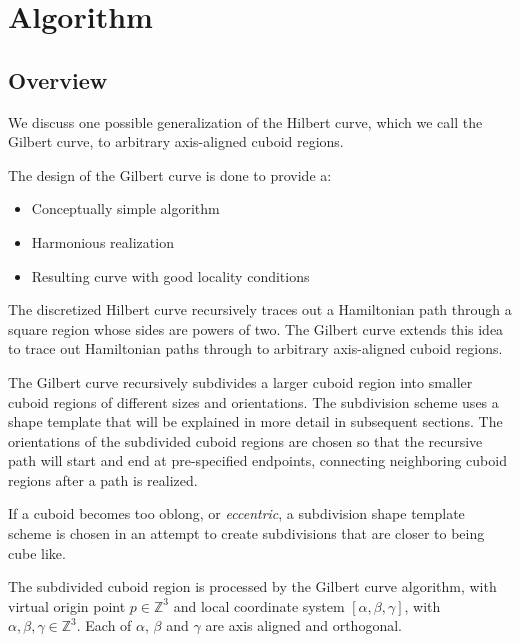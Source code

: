 \section{Algorithm}

\subsection{Overview}

We discuss one possible generalization of the Hilbert curve, which we call the Gilbert curve,
to arbitrary axis-aligned cuboid regions.

The design of the Gilbert curve is done to provide a:

\begin{itemize}
  \item Conceptually simple algorithm
  \item Harmonious realization
  \item Resulting curve with good locality conditions
\end{itemize}

The discretized Hilbert curve recursively traces out a Hamiltonian path through a square
region whose sides are powers of two.
The Gilbert curve extends this idea to trace out Hamiltonian paths through to arbitrary axis-aligned
cuboid regions.

The Gilbert curve recursively subdivides a larger cuboid region into smaller cuboid
regions of different sizes and orientations.
The subdivision scheme uses a shape template that will be explained in more detail in subsequent sections.
The orientations of the subdivided cuboid regions are chosen so that the recursive path
will start and end at pre-specified endpoints, connecting neighboring cuboid regions
after a path is realized.

If a cuboid becomes too oblong, or \textit{eccentric}, a subdivision shape template scheme is chosen
in an attempt to create subdivisions that are closer to being cube like.


The subdivided cuboid region is processed by the Gilbert curve algorithm,
with virtual origin point $p \in \mathbb{Z}^3$ and local coordinate system $[ \alpha, \beta, \gamma ]$,
with $\alpha, \beta, \gamma \in \mathbb{Z}^3$.
Each of $\alpha$, $\beta$ and $\gamma$ are axis aligned and orthogonal.

